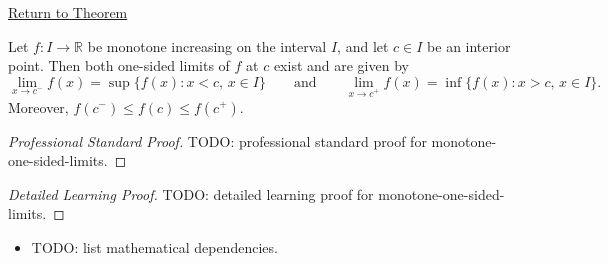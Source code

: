 \newpage
{}
\label{prf:monotone-one-sided-limits}

\begin{remark*}[Return]
\hyperref[thm:monotone-one-sided-limits]{Return to Theorem}
\end{remark*}

\begin{theorem*}
Let $f : I \to \mathbb{R}$ be monotone increasing on the interval $I$, and let $c \in I$ be an interior point. Then both one-sided limits of $f$ at $c$ exist and are given by
\[
  \lim_{x \to c^{-}} f(x) = \sup\{f(x) : x < c,\, x \in I\}
  \qquad \text{and} \qquad
  \lim_{x \to c^{+}} f(x) = \inf\{f(x) : x > c,\, x \in I\}.
\]
Moreover, $f(c^{-}) \leq f(c) \leq f(c^{+})$.
\end{theorem*}

\begin{proof}[Professional Standard Proof]
\LRAProofBodyStart
TODO: professional standard proof for monotone-one-sided-limits.
\end{proof}

\begin{proof}[Detailed Learning Proof]
\LRAProofBodyStart
TODO: detailed learning proof for monotone-one-sided-limits.
\end{proof}

\begin{remark*}
\end{remark*}

\begin{dependencies}
\begin{itemize}
  \item TODO: list mathematical dependencies.
\end{itemize}
\end{dependencies}

\clearpage
